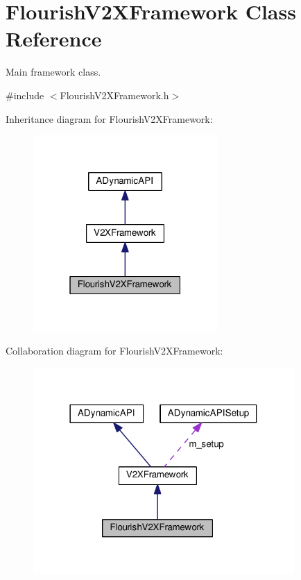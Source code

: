 \hypertarget{classFlourishV2XFramework}{}\section{Flourish\+V2\+X\+Framework Class Reference}
\label{classFlourishV2XFramework}


Main framework class.  




{\ttfamily \#include $<$Flourish\+V2\+X\+Framework.\+h$>$}



Inheritance diagram for Flourish\+V2\+X\+Framework\+:\nopagebreak
\begin{figure}[H]
\begin{center}
\leavevmode
\includegraphics[width=199pt]{classFlourishV2XFramework__inherit__graph}
\end{center}
\end{figure}


Collaboration diagram for Flourish\+V2\+X\+Framework\+:\nopagebreak
\begin{figure}[H]
\begin{center}
\leavevmode
\includegraphics[width=282pt]{classFlourishV2XFramework__coll__graph}
\end{center}
\end{figure}
